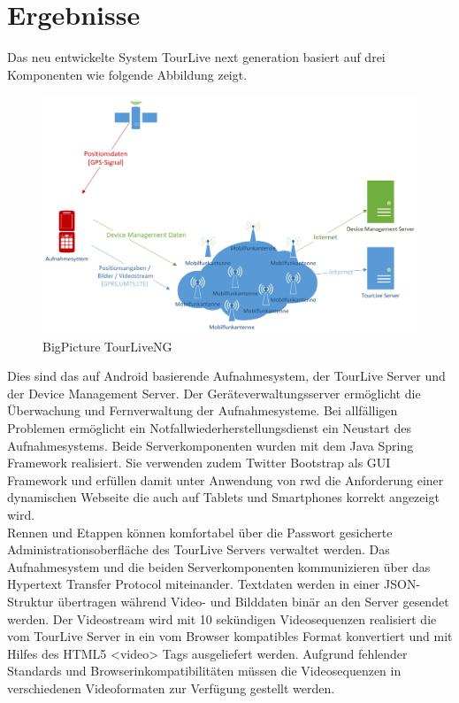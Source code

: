 \section*{Ergebnisse}
Das neu entwickelte System TourLive next generation basiert auf drei Komponenten wie folgende Abbildung zeigt. 
\begin{figure}[H]
	\centering
	\includegraphics[width=150mm]{images/android/BigPicture_AndroidClient.png} 
	\caption{BigPicture TourLiveNG}
\end{figure}
Dies sind das auf Android basierende Aufnahmesystem, der TourLive Server und der Device Management Server. Der Geräteverwaltungsserver ermöglicht die Überwachung und Fernverwaltung der Aufnahmesysteme. Bei allfälligen Problemen ermöglicht ein Notfallwiederherstellungsdienst ein Neustart des Aufnahmesystems. Beide Serverkomponenten wurden mit dem Java Spring Framework realisiert. Sie verwenden zudem Twitter Bootstrap als GUI Framework und erfüllen damit unter Anwendung von \gls{rwd} die Anforderung einer dynamischen Webseite die auch auf Tablets und Smartphones korrekt angezeigt wird. 
\\

Rennen und Etappen können komfortabel über die Passwort gesicherte Administrationsoberfläche des TourLive Servers  verwaltet werden. Das Aufnahmesystem und die beiden Serverkomponenten kommunizieren über das Hypertext Transfer Protocol miteinander. Textdaten werden in einer JSON-Struktur übertragen während Video- und Bilddaten binär an den Server gesendet  werden. Der Videostream wird mit 10 sekündigen Videosequenzen realisiert die vom TourLive Server in ein vom Browser kompatibles Format konvertiert und mit Hilfes des HTML5 <video> Tags ausgeliefert werden. Aufgrund fehlender Standards und Browserinkompatibilitäten müssen die Videosequenzen in verschiedenen Videoformaten zur Verfügung gestellt werden.



